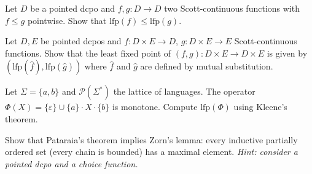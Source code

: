 \begin{exercise}
Let $D$ be a pointed dcpo and $f, g\colon D \to D$ two Scott-continuous functions with
$f \leq g$ pointwise. Show that $\mathrm{lfp}(f) \leq \mathrm{lfp}(g)$.
\end{exercise}

\begin{exercise}
Let $D, E$ be pointed dcpos and $f\colon D \times E \to D$, $g\colon D \times E \to E$
Scott-continuous functions. Show that the least fixed point of
$(f,g)\colon D \times E \to D \times E$ is given by
$(\mathrm{lfp}(\hat{f}), \mathrm{lfp}(\hat{g}))$ where $\hat{f}$ and $\hat{g}$ are
defined by mutual substitution.
\end{exercise}

\begin{exercise}
Let $\Sigma = \{a, b\}$ and $\mathcal{P}(\Sigma^*)$ the lattice of languages. The
operator $\Phi(X) = \{\varepsilon\} \cup \{a\} \cdot X \cdot \{b\}$ is monotone. Compute
$\mathrm{lfp}(\Phi)$ using Kleene's theorem.
\end{exercise}

\begin{exercise}
Show that Pataraia's theorem implies Zorn's lemma: every inductive partially ordered set
(every chain is bounded) has a maximal element.
\emph{Hint: consider a pointed dcpo and a choice function.}
\end{exercise}
